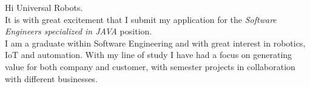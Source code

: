 \documentclass[10pt,a4paper]{altacv}
\begin{document}


\makecvheader




\vspace{5mm}
Hi Universal Robots.
\\
\vspace{5mm}
It is with great excitement that I submit my application for the \textit{Software Engineers specialized in JAVA} position.
\\
\vspace{5mm}
I am a graduate within Software Engineering and with great interest in robotics, IoT and automation.
With my line of study I have had a focus on generating value for both company and customer, with semester projects in collaboration with different businesses.   
\\
\end{document}
